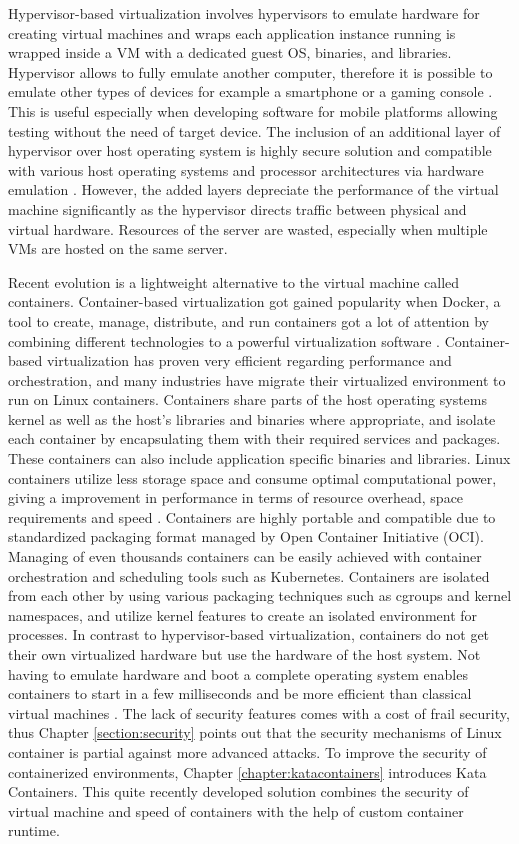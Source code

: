 Hypervisor-based virtualization involves hypervisors to emulate hardware for creating virtual machines and wraps each application instance running is wrapped inside a VM with a dedicated guest OS, binaries, and libraries. Hypervisor allows to fully emulate another computer, therefore it is possible to emulate other types of devices for example a smartphone or a gaming console \cite{Eder2016}. This is useful especially when developing software for mobile platforms allowing testing without the need of target device. The inclusion of an additional layer of hypervisor over host operating system is highly secure solution and compatible with various host operating systems and processor architectures via hardware emulation \cite{Lingayat2018}. However, the added layers depreciate the performance of the virtual machine significantly as the hypervisor directs traffic between physical and virtual hardware. Resources of the server are wasted, especially when multiple VMs are hosted on the same server. %

Recent evolution is a lightweight alternative to the virtual machine called containers. Container-based virtualization got gained popularity when Docker, a tool to create, manage, distribute, and run containers got a lot of attention by combining different technologies to a powerful virtualization software \cite{Eder2016}. Container-based virtualization has proven very efficient regarding performance and orchestration, and many industries have migrate their virtualized environment to run on Linux containers. Containers share parts of the host operating systems kernel as well as the host’s libraries and binaries where appropriate, and isolate each container by encapsulating them with their required services and packages.  These containers can also include application specific binaries and libraries. Linux containers utilize less storage space and consume optimal computational power, giving a improvement in performance in terms of resource overhead, space requirements and speed \cite{Toimela2017}\cite{Lingayat2018}. Containers are highly portable and compatible due to standardized packaging format managed by Open Container Initiative (OCI)\cite{OCI}. Managing of even thousands containers can be easily achieved with container orchestration and scheduling tools such as Kubernetes. Containers are isolated from each other by using various packaging techniques such as cgroups and kernel namespaces, and utilize kernel features to create an isolated environment for processes. In contrast to hypervisor-based virtualization, containers do not get their own virtualized hardware but use the hardware of the host system. Not having to emulate hardware and boot a complete operating system enables containers to start in a few milliseconds and be more efficient than classical virtual machines \cite{Eder2016}. The lack of security features comes with a cost of frail security, thus Chapter \ref{section:security} points out that the security mechanisms of Linux container is partial against more advanced attacks. To improve the security of containerized environments, Chapter \ref{chapter:katacontainers} introduces Kata Containers. This quite recently developed solution combines the security of virtual machine and speed of containers with the help of custom container runtime.

